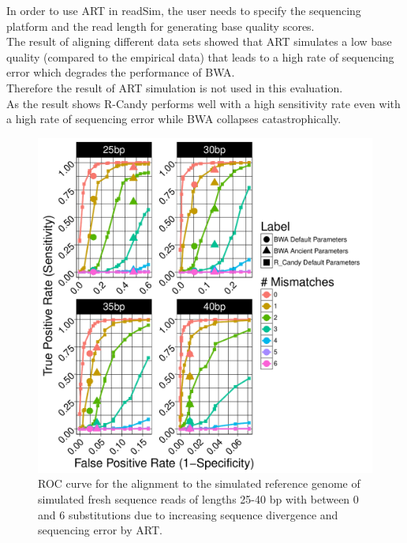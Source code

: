\documentclass[11pt,a4paper]{report}
\begin{document}
In order to use ART in readSim, the user needs to specify the sequencing
platform and the read length for generating base quality scores.\\

The result of aligning different data sets showed that ART simulates a
low base quality (compared to the empirical data) that leads to 
a high rate of sequencing error which degrades the performance of BWA.\\
Therefore the result of ART simulation is not used in this evaluation. \\

As the result shows R-Candy performs well with a high sensitivity rate 
even with a high rate of sequencing error while BWA collapses catastrophically.\\

\begin{figure}[H]
\centering
\includegraphics[width=12cm]{pictures/f_DS3_ART.pdf}
\caption{
ROC curve for the alignment to the simulated reference genome of simulated fresh 
sequence reads of lengths 25-40 bp with between 0 and 6 substitutions due 
to increasing sequence divergence and sequencing error by ART.}
\label{DS3_ART}
\end{figure}
\end{document}
